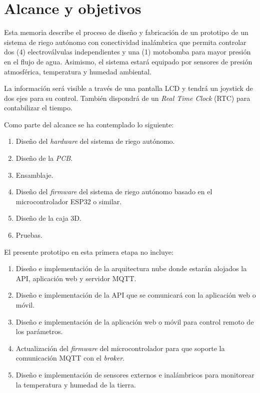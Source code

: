 \section{Alcance y objetivos}

Esta memoria describe el proceso de diseño y fabricación de un prototipo de un sistema de riego autónomo con conectividad inalámbrica que permita controlar dos (4) electroválvulas independientes y una (1) motobomba para mayor presión en el flujo de agua. Asimismo, el sistema estará equipado por sensores de presión atmosférica, temperatura y humedad ambiental.

La información será visible a través de una pantalla LCD y tendrá un joystick de dos ejes para su control. También dispondrá de un \textit{Real Time Clock} (RTC) para contabilizar el tiempo.

Como parte del alcance se ha contemplado lo siguiente:

\begin{enumerate}
	\item Diseño del \textit{hardware} del sistema de riego autónomo.
	\item Diseño de la \textit{PCB}.
	\item Ensamblaje.
	\item Diseño del \textit{firmware} del sistema de riego autónomo basado en el microcontrolador ESP32 o similar.
	\item Diseño de la caja 3D.
	\item Pruebas.
\end{enumerate}

El presente prototipo en esta primera etapa no incluye:
\begin{enumerate}
	\item Diseño e implementación de la arquitectura nube donde estarán alojados la API, aplicación web y servidor MQTT.
	\item Diseño e implementación de la API que se comunicará con la aplicación web o móvil.
	\item Diseño e implementación de la aplicación web o móvil para control remoto de los parámetros.
	\item Actualización del \textit{firmware} del microcontrolador para que soporte la comunicación MQTT con el \textit{broker}.
	\item Diseño e implementación de sensores externos e inalámbricos para monitorear la temperatura y humedad de la tierra.
\end{enumerate}

